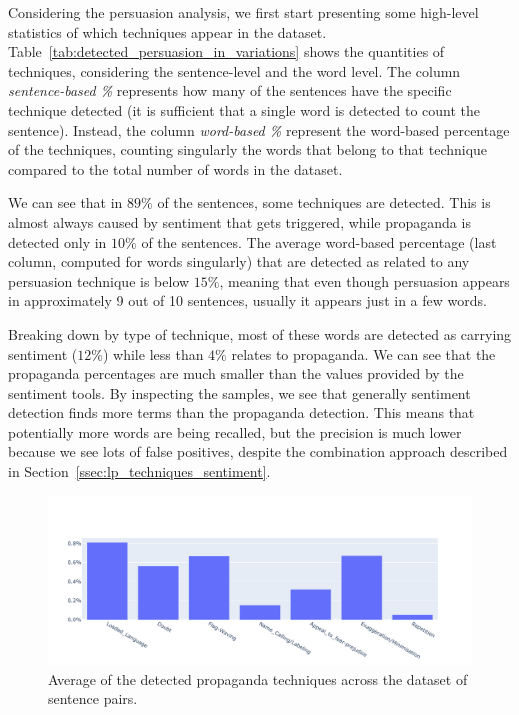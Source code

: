 Considering the persuasion analysis, we first start presenting some high-level statistics of which techniques appear in the dataset.
Table~\ref{tab:detected_persuasion_in_variations} shows the quantities of techniques, considering the sentence-level and the word level. The column \textit{sentence-based \%} represents how many of the sentences have the specific technique detected (it is sufficient that a single word is detected to count the sentence). Instead, the column \textit{word-based \%} represent the word-based percentage of the techniques, counting singularly the words that belong to that technique compared to the total number of words in the dataset.

We can see that in $89\%$
of the sentences, some techniques are detected.
This is almost always caused by sentiment that gets triggered, while propaganda is detected only in $10\%$ of the sentences.
The average word-based percentage (last column, computed for words singularly) that are detected as related to any persuasion technique is below $15\%$,
meaning that even though persuasion appears in approximately 9 out of 10 sentences, usually it appears just in a few words.

Breaking down by type of technique, most of these words are detected as carrying sentiment ($12\%$) while less than $4\%$ relates to propaganda.
We can see that the propaganda percentages are much smaller than the values provided by the sentiment tools.
By inspecting the samples, we see that generally sentiment detection finds more terms than the propaganda detection. This means that potentially more words are being recalled, but the precision is much lower because we see lots of false positives, despite the combination approach described in Section~\ref{ssec:lp_techniques_sentiment}.

\begin{figure}[!htbp]
    \centering
    \includegraphics[width=\linewidth]{figures/4.3.1_propaganda_avg.pdf}
    \caption{Average of the detected propaganda techniques across the dataset of sentence pairs.}
    \label{fig:propaganda_avg}
\end{figure}

